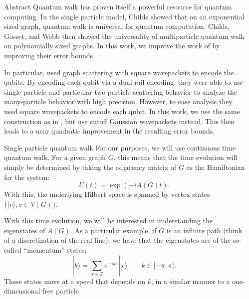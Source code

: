 \documentclass{beamer}
\newlength{\sepwid}
\newlength{\onecolwid}
\newcommand{\sket}[1]{|{#1}\rangle}
\newcommand{\ZZ}{\mathbb{Z}}
\begin{document}

\begin{frame}[t]
\begin{columns}[t]
\begin{column}{\sepwid}\end{column}

\begin{column}{\onecolwid}
  \begin{alertblock}{Abstract}
    Quantum walk has proven itself a powerful resource for quantum computing.  In the single particle model, Childs \cite{Chi09} showed that on an exponential sized graph, quantum walk is universal for quantum computation.  Childs, Gosset, and Webb \cite{MPQW} then showed the universality of multiparticle quantum walk on polynomially sized graphs.  In this work, we improve the work of \cite{MPQW} by improving their error bounds.

    In particular, \cite{MPQW} used graph scattering with square wavepackets to encode the qubits.  By encoding each qubit via a dual-rail encoding, they were able to use single particle and particular two-particle scattering behavior to analyze the many-particle behavior with high precision.  However, to ease analysis they used square wavepackets to encode each qubit.  In this work, we use the same construction as in \cite{MPQW}, but use cutoff Gaussian wavepackets instead.  This then leads to a near quadratic improvement in the resulting error bounds.
  \end{alertblock}
  
  \begin{block}{Single particle quantum walk}
    For our purposes, we will use continuous time quantum walk.  For a given graph $G$, this means that the time evolution will simply be determined by taking the adjacency matrix of $G$ as the Hamiltonian for the system:
    \[
      U(t) = \exp(- i A(G) t).
    \]
    With this, the underlying Hilbert space is spanned by vertex states $\{\sket{v}, v\in V(G)\}$.

    With this time evolution, we will be interested in understanding the eigenstates of $A(G)$.  As a particular example, if $G$ is an infinite path (think of a discretization of the real line), we have that the eigenstates are of the so-called ``momentum'' states:
    \[
      \sket{\tilde{k}} = \sum_{x\in \ZZ} e^{-i k x} \sket{x} \qquad k\in [-\pi,\pi).
    \]
    These states move at a speed that depends on $k$, in a similar manner to a one-dimensional free particle.
    

\end{block}
\end{column}
\end{columns}
\end{frame}
\end{document}
